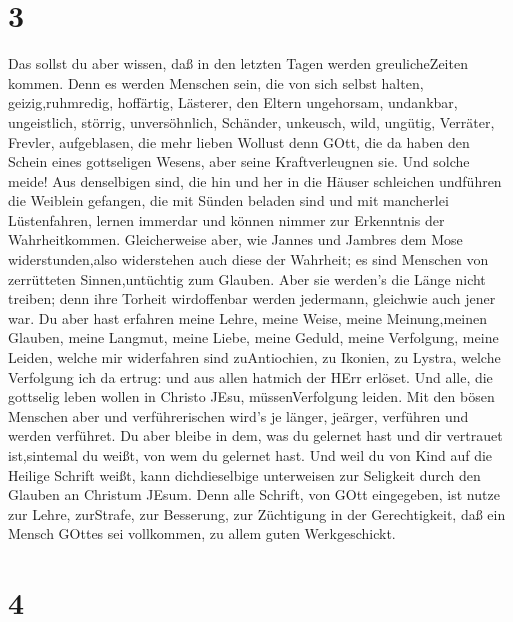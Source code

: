 \hypertarget{section-2}{%
\section{3}\label{section-2}}

 Das sollst du aber wissen, daß in den letzten Tagen werden
greulicheZeiten kommen.  Denn es werden Menschen sein, die
von sich selbst halten, geizig,ruhmredig, hoffärtig, Lästerer, den
Eltern ungehorsam, undankbar, ungeistlich,  störrig,
unversöhnlich, Schänder, unkeusch, wild, ungütig,  Verräter,
Frevler, aufgeblasen, die mehr lieben Wollust denn GOtt, 
die da haben den Schein eines gottseligen Wesens, aber seine
Kraftverleugnen sie. Und solche meide!  Aus denselbigen
sind, die hin und her in die Häuser schleichen undführen die Weiblein
gefangen, die mit Sünden beladen sind und mit mancherlei Lüstenfahren,
 lernen immerdar und können nimmer zur Erkenntnis der
Wahrheitkommen.  Gleicherweise aber, wie Jannes und Jambres
dem Mose widerstunden,also widerstehen auch diese der Wahrheit; es sind
Menschen von zerrütteten Sinnen,untüchtig zum Glauben.  Aber
sie werden's die Länge nicht treiben; denn ihre Torheit wirdoffenbar
werden jedermann, gleichwie auch jener war.  Du aber hast
erfahren meine Lehre, meine Weise, meine Meinung,meinen Glauben, meine
Langmut, meine Liebe, meine Geduld,  meine Verfolgung,
meine Leiden, welche mir widerfahren sind zuAntiochien, zu Ikonien, zu
Lystra, welche Verfolgung ich da ertrug: und aus allen hatmich der HErr
erlöset.  Und alle, die gottselig leben wollen in Christo
JEsu, müssenVerfolgung leiden.  Mit den bösen Menschen aber
und verführerischen wird's je länger, jeärger, verführen und werden
verführet.  Du aber bleibe in dem, was du gelernet hast und
dir vertrauet ist,sintemal du weißt, von wem du gelernet hast.
 Und weil du von Kind auf die Heilige Schrift weißt, kann
dichdieselbige unterweisen zur Seligkeit durch den Glauben an Christum
JEsum.  Denn alle Schrift, von GOtt eingegeben, ist nutze
zur Lehre, zurStrafe, zur Besserung, zur Züchtigung in der
Gerechtigkeit,  daß ein Mensch GOttes sei vollkommen, zu
allem guten Werkgeschickt.

\hypertarget{section-3}{%
\section{4}\label{section-3}}

